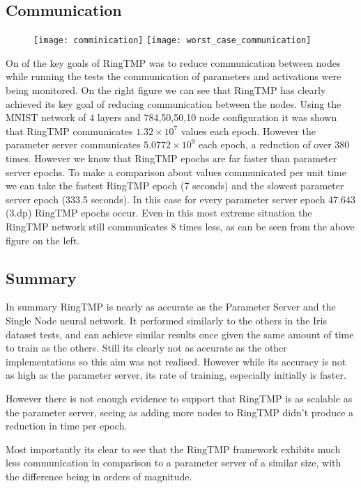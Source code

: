 \subsection{Communication}
\begin{figure}[h]
    \centering
    \texttt{[image: comminication]}
    \texttt{[image: worst\_case\_communication]}

\end{figure}
On of the key goals of RingTMP was to reduce communication between nodes while
running the tests the communication of parameters and activations were being
monitored. On the right figure we can see that RingTMP has clearly achieved its
key goal of reducing communication between the nodes. Using the MNIST network of
4 layers and 784,50,50,10 node configuration it was shown that RingTMP
communicates \(1.32 \times 10^{7}\) values each epoch. However the parameter
server communicates \( 5.0772 \times 10^{9}\) each epoch, a reduction of over
380 times. However we know that RingTMP epochs are far faster than parameter
server epochs. To make a comparison about values communicated per unit time we
can take the fastest RingTMP epoch (7 seconds) and the slowest parameter server
epoch (333.5 seconds). In this case for every parameter server epoch 47.643
(3.dp) RingTMP epochs occur. Even in this most extreme situation the RingTMP
network still communicates 8 times less, as can be seen from the above figure on the
left.


\subsection{Summary}
In summary RingTMP is nearly as accurate as the Parameter Server and the Single
Node neural network. It performed similarly to the others in the Iris dataset
tests, and can achieve similar results once given the same amount of time to
train as the others. Still its clearly not as accurate as the other
implementations so this aim was not realised. However while its accuracy is not
as high as the parameter server, its rate of training, especially initially is
faster.

However there is not enough evidence to support that RingTMP is as scalable as
the parameter server, seeing as adding more nodes to RingTMP didn't produce a
reduction in time per epoch.

Most importantly its clear to see that the RingTMP framework exhibits much less
communication in comparison to a parameter server of a similar size, with the
difference being in orders of magnitude.








